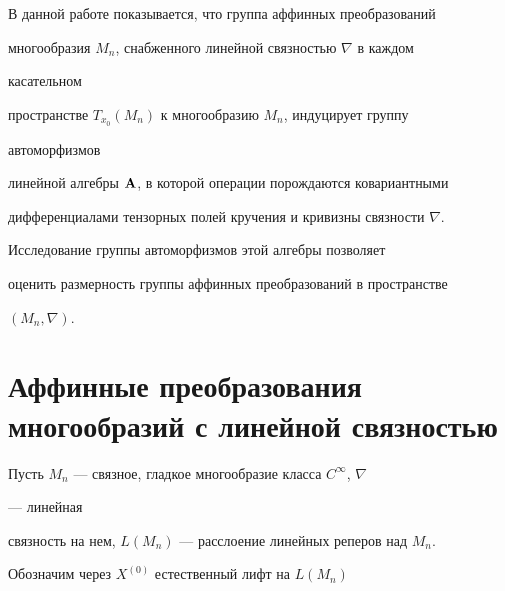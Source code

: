  


\date{} 




\pagestyle{plain} %


 




\maketitle 


\label{begin} 


 


 


В данной работе показывается, что группа аффинных преобразований  


многообразия $M_n$, снабженного линейной связностью $\nabla$ в каждом 


касательном  


пространстве $T_{x_0}(M_n)$ к многообразию $M_n$, индуцирует группу 


автоморфизмов  


линейной алгебры $\bold A$, в которой операции порождаются ковариантными  


дифференциалами тензорных полей кручения и кривизны связности $\nabla$. 


Исследование группы автоморфизмов этой алгебры позволяет  


оценить размерность группы аффинных преобразований в пространстве 


$(M_n,\nabla)$. 


 


 


\section{Аффинные преобразования многообразий с линейной связностью} 


 


Пусть $M_n$ --- связное, гладкое многообразие класса $C^\infty$, $\nabla$ 


--- линейная  


связность на нем, $L(M_n)$ --- расслоение линейных реперов над $M_n$. 


Обозначим  через $X^{(0)}$ естественный лифт на $L(M_n)$ 


